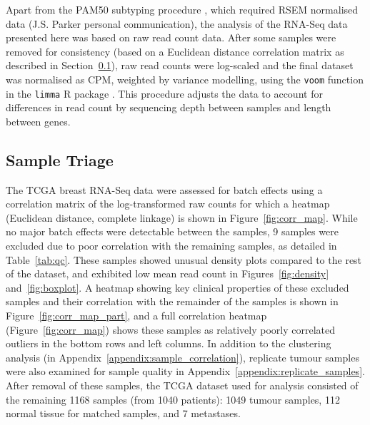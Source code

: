 Apart from the \gls{PAM50} subtyping procedure \citep{Parker2009}, which required \gls{RSEM} normalised data (J.S. Parker personal communication), the analysis of the \gls{RNA-Seq} data presented here was based on raw read count data. After some samples were removed for consistency (based on a Euclidean distance correlation matrix as described in Section~\ref{methods:sample_qc}), raw read counts were log-scaled and the final dataset was %
normalised as \gls{CPM}, weighted by variance modelling, using the \texttt{voom} function \citep{Law2014} in the \texttt{limma} R package \citep{limma}. This procedure adjusts the data to account for differences in read count by sequencing depth between samples and length between genes.

\FloatBarrier

\subsection{Sample Triage} \label{methods:sample_qc}

The \gls{TCGA} breast \gls{RNA-Seq} data were assessed for batch effects using a correlation matrix of the log-transformed raw counts for which a heatmap (Euclidean distance, complete linkage) is shown in Figure~\ref{fig:corr_map}. While no major batch effects were detectable between the samples, 9 samples were excluded due to poor correlation with the remaining samples, as detailed in Table~\ref{tab:qc}. These samples showed unusual density plots compared to the rest of the dataset, and exhibited low mean read count in Figures~\ref{fig:density} and~\ref{fig:boxplot}. A heatmap showing key clinical properties of these excluded samples and their correlation with the remainder of the samples is shown in Figure~\ref{fig:corr_map_part}, and a full correlation heatmap (Figure~\ref{fig:corr_map}) shows these samples as relatively poorly correlated outliers in the bottom rows and left columns.
In addition to the clustering analysis (in Appendix~\ref{appendix:sample_correlation}), replicate tumour samples were also examined for sample quality in Appendix~\ref{appendix:replicate_samples}.
After removal of these samples, the \gls{TCGA} dataset used for analysis consisted of the remaining 1168 samples (from 1040 patients): 1049 tumour samples, 112 normal tissue for matched samples, and 7 metastases.


